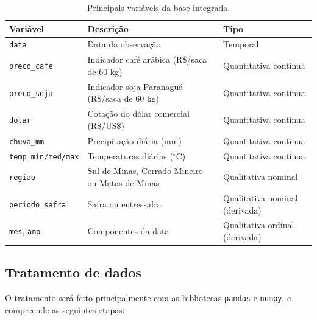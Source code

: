 \documentclass{article}
\begin{document}
\begin{table}[H]
      \centering
      \small
      \caption{Principais variáveis da base integrada.}
      \label{tab:variaveis}
      \begin{tabularx}{\textwidth}{>{\raggedright\arraybackslash}p{3.8cm}
                  >{\raggedright\arraybackslash}X
                  >{\raggedright\arraybackslash}p{3.8cm}}
            \toprule
            \textbf{Variável}           & \textbf{Descrição}                               & \textbf{Tipo}                       \\
            \midrule
            \texttt{data}               & Data da observação                               & Temporal                            \\
            \texttt{preco\_cafe}        & Indicador café arábica (R\$/saca de 60 kg)       & Quantitativa contínua               \\
            \texttt{preco\_soja}        & Indicador soja Paranaguá (R\$/saca de 60 kg)     & Quantitativa contínua               \\
            \texttt{dolar}              & Cotação do dólar comercial (R\$/US\$)            & Quantitativa contínua               \\
            \texttt{chuva\_mm}          & Precipitação diária (mm)                         & Quantitativa contínua               \\
            \texttt{temp\_min/med/max}  & Temperaturas diárias ($^\circ$C)                 & Quantitativa contínua               \\
            \texttt{regiao}             & Sul de Minas, Cerrado Mineiro ou Matas de Minas  & Qualitativa nominal                 \\
            \texttt{periodo\_safra}     & Safra ou entressafra                             & Qualitativa nominal (derivada)      \\
            \texttt{mes}, \texttt{ano}  & Componentes da data                              & Qualitativa ordinal (derivada)      \\
            \bottomrule
      \end{tabularx}
\end{table}

\subsection{Tratamento de dados}

O tratamento será feito principalmente com as bibliotecas \texttt{pandas} e \texttt{numpy}, e
compreende as seguintes etapas:
\end{document}
